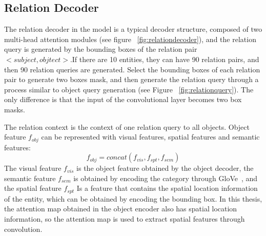 



\subsection{Relation Decoder}
The relation decoder in the model is a typical decoder structure, composed of two multi-head attention modules (see figure ~\ref{fig:relationdecoder}), and the relation query is generated by the bounding boxes of the relation pair$<subject,objtect>$.If there are 10 entities, they can have 90 relation pairs, and then 90 relation queries are generated. Select the bounding boxes of each relation pair to generate two boxes mask, and then generate the relation query through a process similar to object query generation (see Figure ~\ref{fig:relationquery}). The only difference is that the input of the convolutional layer becomes two box masks.%

The relation context is the context of one relation query to all objects. Object feature $f_{obj} $ can be represented with visual features, spatial features and semantic features: $$f_{obj} = concat(f_{vis},f_{spt},f_{sem})$$ 
The visual feature $f_{ vis}$ is the object feature obtained by the object decoder, the semantic feature $f_{sem}$ is obtained by encoding the category through GloVe~\cite{pennington2014glove}, and the spatial feature $f_{spt} $ Is a feature that contains the spatial location information of the entity, which can be obtained by encoding the bounding box. In this thesis, the attention map obtained in the object encoder also has spatial location information, so the attention map is used to extract spatial features through convolution.


